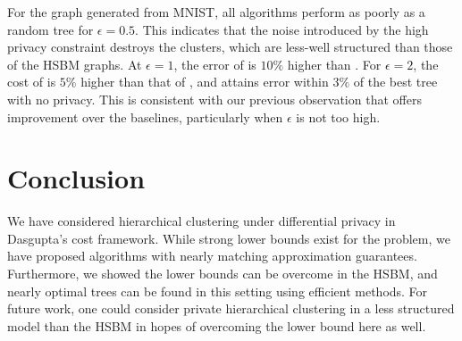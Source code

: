 For the graph generated from MNIST, all algorithms perform as poorly as a random tree for $\epsilon = 0.5$. This indicates that the noise introduced by the high privacy constraint destroys the clusters, which are less-well structured than those of the HSBM graphs. At $\epsilon = 1$, the error of \sparsecut{} is $10\%$ higher than \dphchsbm{}. For $\epsilon = 2$, the cost of \sparsecut{} is $5\%$ higher than that of \dphchsbm{}, and \dphchsbm{} attains error within $3\%$ of the best tree with no privacy. This is consistent with our previous observation that \dphchsbm{} offers improvement over the baselines, particularly when $\epsilon$ is not too high.

\section{Conclusion}
We have considered hierarchical clustering under differential privacy in Dasgupta's cost framework. While strong lower bounds exist for the problem, we have proposed algorithms with nearly matching approximation guarantees. Furthermore, we showed the lower bounds can be overcome in the HSBM, and nearly optimal trees can be found in this setting using efficient methods. For future work, one could consider private hierarchical clustering in a less structured model than the HSBM in hopes of overcoming the lower bound here as well.

